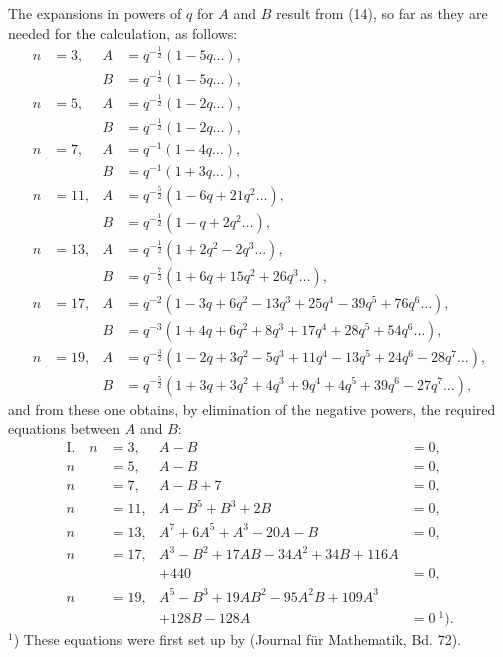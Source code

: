 The expansions in powers of $q$ for $A$ and $B$ result
from (14), so far as they are needed for the calculation,
as follows:
\[
\begin{aligned}
n &= 3, & A &= q^{-\frac{1}{2}}(1 - 5q \dots), \\
& & B &= q^{-\frac{1}{2}}(1 - 5q \dots), \\
n &= 5, & A &= q^{-\frac{1}{2}}(1 - 2q \dots), \\
& & B &= q^{-\frac{1}{2}}(1 - 2q \dots), \\
n &= 7, & A &= q^{-1}(1 - 4q \dots), \\
& & B &= q^{-1}(1 + 3q \dots), \\
n &= 11, & A &= q^{-\frac{5}{2}}(1 - 6q + 21q^2 \dots), \\
& & B &= q^{-\frac{1}{2}}(1 - q + 2q^2 \dots), \\
n &= 13, & A &= q^{-\frac{1}{2}}(1 + 2q^2 - 2q^3 \dots), \\
& & B &= q^{-\frac{7}{2}}(1 + 6q + 15q^2 + 26q^3 \dots), \\
n &= 17, & A &= q^{-2}(1 - 3q + 6q^2 - 13q^3 + 25q^4 - 39q^5 + 76q^6 \dots), \\
& & B &= q^{-3}(1 + 4q + 6q^2 + 8q^3 + 17q^4 + 28q^5 + 54q^6 \dots), \\
n &= 19, & A &= q^{-\frac{3}{2}}(1 - 2q + 3q^2 - 5q^3 + 11q^4 - 13q^5 + 24q^6 - 28q^7 \dots), \\
& & B &= q^{-\frac{5}{2}}(1 + 3q + 3q^2 + 4q^3 + 9q^4 + 4q^5 + 39q^6 - 27q^7 \dots),
\end{aligned}
\]
and from these one obtains, by elimination of the negative powers,
the required equations between $A$ and $B$:
\[
\begin{aligned}
\text{I.}\quad n &= 3, & A - B &= 0, \\
n &= 5, & A - B &= 0, \\
n &= 7, & A - B + 7 &= 0, \\
n &= 11, & A - B^5 + B^3 + 2B &= 0, \\
n &= 13, & A^7 + 6A^5 + A^3 - 20A - B &= 0, \\
n &= 17, & A^3 - B^2 + 17AB - 34A^2 + 34B + 116A \\
& & + 440 &= 0, \\
n &= 19, & A^5 - B^3 + 19AB^2 - 95A^2B + 109A^3 \\
& & + 128B - 128A &= 0\ ^{1}).
\end{aligned}
\]
$^{1}$) These equations were first set up by  (Journal für
Mathematik, Bd. 72).
